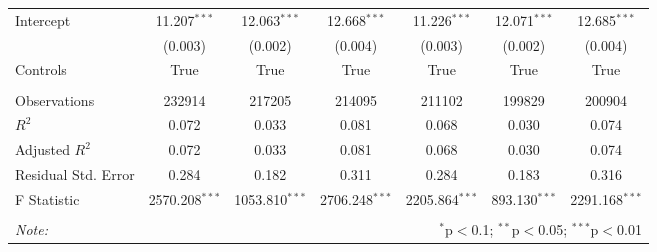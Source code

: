 \begin{tabular}{@{\extracolsep{5pt}}lcccccc}
Intercept & 11.207$^{***}$ & 12.063$^{***}$ & 12.668$^{***}$ & 11.226$^{***}$ & 12.071$^{***}$ & 12.685$^{***}$ \\
& (0.003) & (0.002) & (0.004) & (0.003) & (0.002) & (0.004) \\
Controls & True & True & True & True & True & True \\
\hline \\[-1.8ex]
 Observations & 232914 & 217205 & 214095 & 211102 & 199829 & 200904 \\
 $R^2$ & 0.072 & 0.033 & 0.081 & 0.068 & 0.030 & 0.074 \\
 Adjusted $R^2$ & 0.072 & 0.033 & 0.081 & 0.068 & 0.030 & 0.074 \\
 Residual Std. Error & 0.284  & 0.182  & 0.311  & 0.284  & 0.183  & 0.316  \\
 F Statistic & 2570.208$^{***}$  & 1053.810$^{***}$  & 2706.248$^{***}$  & 2205.864$^{***}$  & 893.130$^{***}$  & 2291.168$^{***}$  \\
\hline
\hline \\[-1.8ex]
\textit{Note:} & \multicolumn{6}{r}{$^{*}$p$<$0.1; $^{**}$p$<$0.05; $^{***}$p$<$0.01} \\
\end{tabular}
